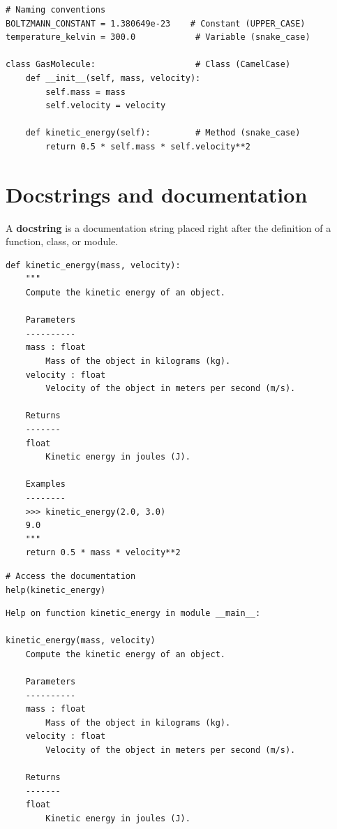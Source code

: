 \begin{codeblock}[title=\textbf{Python}]
\begin{verbatim}
# Naming conventions
BOLTZMANN_CONSTANT = 1.380649e-23    # Constant (UPPER_CASE)
temperature_kelvin = 300.0            # Variable (snake_case)

class GasMolecule:                    # Class (CamelCase)
    def __init__(self, mass, velocity):
        self.mass = mass
        self.velocity = velocity

    def kinetic_energy(self):         # Method (snake_case)
        return 0.5 * self.mass * self.velocity**2
\end{verbatim}
\end{codeblock}

\section{Docstrings and documentation}

A \textbf{docstring} is a documentation string placed right after the
definition of a function, class, or module.

\begin{codeblock}[title=\textbf{Python}]
\begin{verbatim}
def kinetic_energy(mass, velocity):
    """
    Compute the kinetic energy of an object.

    Parameters
    ----------
    mass : float
        Mass of the object in kilograms (kg).
    velocity : float
        Velocity of the object in meters per second (m/s).

    Returns
    -------
    float
        Kinetic energy in joules (J).

    Examples
    --------
    >>> kinetic_energy(2.0, 3.0)
    9.0
    """
    return 0.5 * mass * velocity**2
\end{verbatim}
\end{codeblock}

\begin{codeblock}[title=\textbf{Python}]
\begin{verbatim}
# Access the documentation
help(kinetic_energy)
\end{verbatim}
\end{codeblock}

\begin{codeoutput}
\begin{verbatim}
Help on function kinetic_energy in module __main__:

kinetic_energy(mass, velocity)
    Compute the kinetic energy of an object.

    Parameters
    ----------
    mass : float
        Mass of the object in kilograms (kg).
    velocity : float
        Velocity of the object in meters per second (m/s).

    Returns
    -------
    float
        Kinetic energy in joules (J).
\end{verbatim}
\end{codeoutput}

